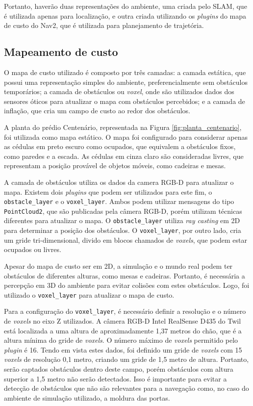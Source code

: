 \documentclass[repeatfields,xlists,xpacks,oneside,yearsonly]{ufrgscca}
\begin{document}
Portanto, haverão duas representações do ambiente, uma criada pelo
SLAM, que é utilizada apenas para localização, e outra criada
utilizando os \textit{plugins} do mapa de custo do Nav2, que é
utilizada para planejamento de trajetória.

\subsection{Mapeamento de custo}

O mapa de custo utilizado é composto por três camadas: a camada
estática, que possui uma representação simples do ambiente,
preferencialmente sem obstáculos temporários; a camada de obstáculos
ou \textit{voxel}, onde são utilizados dados dos sensores óticos para
atualizar o mapa com obstáculos percebidos; e a camada de inflação,
que cria um campo de custo ao redor dos obstáculos.

A planta do prédio Centenário, representada na Figura
\ref{fig:planta_centenario}, foi utilizada como mapa estático. O mapa
foi configurado para considerar apenas as cédulas em preto escuro
como ocupados, que equivalem a obstáculos fixos, como paredes e a
escada. As cédulas em cinza claro são consideradas livres, que
representam a posição provável de objetos móveis, como cadeiras e
mesas.

A camada de obstáculos utiliza os dados da camera RGB-D para
atualizar o mapa. Existem dois \textit{plugins} que podem ser
utilizados para este fim, o \texttt{obstacle\_layer} e o
\texttt{voxel\_layer}. Ambos podem utilizar mensagens do tipo
\texttt{PointCloud2}, que são publicadas pela câmera RGB-D, porém
utilizam técnicas diferentes para atualizar o mapa.  O \texttt{obstacle\_layer} utiliza
\textit{ray casting} em 2D para determinar a posição dos obstáculos.
O \texttt{voxel\_layer}, por outro lado, cria um gride
tri-dimensional, divido em blocos chamados de \textit{voxels}, que
podem estar ocupados ou livres.

Apesar do mapa de custo ser em 2D, a simulação e o mundo real podem
ter obstáculos de diferentes alturas, como mesas e cadeiras.
Portanto, é necessária a percepção em 3D do ambiente para evitar
colisões com estes obstáculos. Logo, foi utilizado o
\texttt{voxel\_layer} para atualizar o mapa de custo.

Para a configuração do \texttt{voxel\_layer}, é necessário definir a
resolução e o número de \textit{voxels} no eixo Z utilizados. A
câmera RGB-D Intel RealSense D435 do Twil está localizada a uma
altura de aproximadamente 1,37 metros do chão, que é a altura mínima
do gride de \textit{voxels}. O número máximo de \textit{voxels}
permitido pelo \textit{plugin} é 16. Tendo em vista estes dados, foi
definido um gride de \textit{voxels} com 15 \textit{voxels} de
resolução 0,1 metro, criando um gride de 1,5 metro de altura.
Portanto, serão captados obstáculos dentro deste campo, porém
obstáculos com altura superior a 1,5 metro não serão detectados. Isso
é importante para evitar a detecção de obstáculos que não são
relevantes para a navegação como, no caso do ambiente de simulação
utilizado, a moldura das portas.
\end{document}
